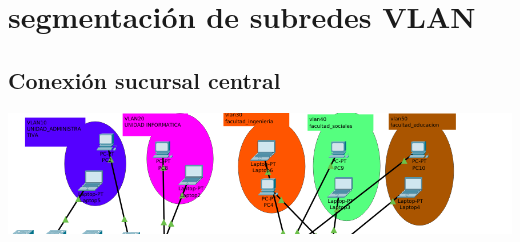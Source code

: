 
\section{segmentaci\'on de subredes VLAN}
\subsection{Conexi\'on sucursal central}
\includegraphics[scale=0.4]{img/vlans.png} 
